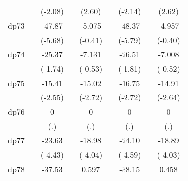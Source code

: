 {\begin{tabular}{l*{8}{c}}
            &                     &     (-2.08)         &                     &      (2.60)         &                     &     (-2.14)         &                     &      (2.62)         \\
[1em]
dp73        &                     &      -47.87\sym{***}&                     &      -5.075         &                     &      -48.37\sym{***}&                     &      -4.957         \\
            &                     &     (-5.68)         &                     &     (-0.41)         &                     &     (-5.79)         &                     &     (-0.40)         \\
[1em]
dp74        &                     &      -25.37         &                     &      -7.131         &                     &      -26.51         &                     &      -7.008         \\
            &                     &     (-1.74)         &                     &     (-0.53)         &                     &     (-1.81)         &                     &     (-0.52)         \\
[1em]
dp75        &                     &      -15.41\sym{*}  &                     &      -15.02\sym{**} &                     &      -16.75\sym{**} &                     &      -14.91\sym{**} \\
            &                     &     (-2.55)         &                     &     (-2.72)         &                     &     (-2.72)         &                     &     (-2.64)         \\
[1em]
dp76        &                     &           0         &                     &           0         &                     &           0         &                     &           0         \\
            &                     &         (.)         &                     &         (.)         &                     &         (.)         &                     &         (.)         \\
[1em]
dp77        &                     &      -23.63\sym{***}&                     &      -18.98\sym{***}&                     &      -24.10\sym{***}&                     &      -18.89\sym{***}\\
            &                     &     (-4.43)         &                     &     (-4.04)         &                     &     (-4.59)         &                     &     (-4.03)         \\
[1em]
dp78        &                     &      -37.53\sym{***}&                     &       0.597         &                     &      -38.15\sym{***}&                     &       0.458         \\

\end{tabular}}
